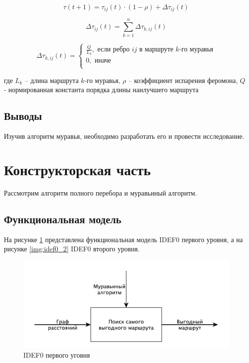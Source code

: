 \documentclass[a4paper,12pt]{article}
\begin{document}
\begin{equation}\label{eq:fer}
    \tau(t+1) = \tau_{ij}(t) \cdot (1 - \rho) + \Delta \tau_{ij}(t)
\end{equation}

\begin{equation}
    \Delta \tau_{ij}(t) = \sum_{k=1}^n \Delta \tau_{k,ij}(t)
\end{equation}

\begin{equation}
    \Delta \tau_{k,ij}(t) =
    \begin{cases}
        \frac{Q}{L_k}, \text{ если ребро } ij \text{ в маршруте } k \text{-го муравья} \\
        0, \text{ иначе} \\
    \end{cases}
\end{equation}

где $L_k$ -- длина маршрута $k$-го муравья, $\rho$ -- коэффициент испарения феромона, $Q$ - нормированная константа
порядка длины наилучшего маршрута

\subsection{Выводы}

Изучив алгоритм муравья, необходимо разработать его и провести исследование.

\newpage
\section{Конструкторская часть}

Рассмотрим алгоритм полного перебора и муравьиный алгоритм.

\subsection{Функциональная модель}

На рисунке \ref{img:idef0} представлена функциональная модель IDEF0
первого уровня, а на рисунке \ref{img:idef0_2} IDEF0 второго уровня.

\begin{figure}[H]
    \centering
    \includegraphics[scale=0.9]{idef0}
    \caption{IDEF0 первого уговня}
    \label{img:idef0}
\end{figure}
\end{document}
